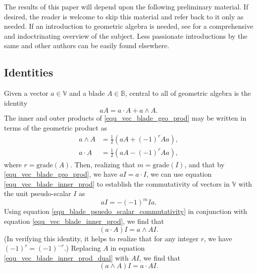 \documentclass{birkjour}
\theoremstyle{definition}
\theoremstyle{remark}
\numberwithin{equation}{section}
\newcommand{\B}{\mathbb{B}}
\newcommand{\V}{\mathbb{V}}
\newcommand{\grade}{\mbox{grade}}
\begin{document}
The results of this paper will depend upon the following preliminary material.
If desired, the reader is welcome to skip this material and refer back to it only as needed.
If an introduction to geometric algebra is needed, see \cite{Hestenes02} for a
comprehensive and indoctrinating overview of the subject.  Less passionate introductions
by the same and other authors can be easily found elsewhere.

\subsection{Identities}

Given a vector $a\in\V$ and a blade $A\in\B$, central to all of geometric algebra is the identity
\begin{equation}\label{equ_vec_blade_geo_prod}
aA = a\cdot A + a\wedge A.
\end{equation}
The inner and outer products of \eqref{equ_vec_blade_geo_prod} may be written in terms
of the geometric product as
\begin{align}
a\wedge A &= \frac{1}{2}\left(aA + (-1)^rAa\right),\label{equ_vec_blade_outer_prod} \\
a\cdot A &= \frac{1}{2}\left(aA - (-1)^rAa\right),\label{equ_vec_blade_inner_prod}
\end{align}
where $r=\grade(A)$.  Then, realizing that $m=\grade(I)$, and that by \eqref{equ_vec_blade_geo_prod},
we have $aI=a\cdot I$, we can use equation \eqref{equ_vec_blade_inner_prod} to establish the
commutativity of vectors in $\V$ with the unit pseudo-scalar $I$ as
\begin{equation}\label{equ_blade_psuedo_scalar_commutativity}
aI = -(-1)^mIa.
\end{equation}
Using equation \eqref{equ_blade_psuedo_scalar_commutativity} in conjunction with equation \eqref{equ_vec_blade_inner_prod},
we find that
\begin{equation}\label{equ_vec_blade_inner_prod_dual}
(a\cdot A)I=a\wedge AI.
\end{equation}
(In verifying this identity, it helps to realize that for any integer $r$, we have $(-1)^r=(-1)^{-r}$.)
Replacing $A$ in equation \eqref{equ_vec_blade_inner_prod_dual} with $AI$, we find that
\begin{equation}\label{equ_vec_blade_outer_prod_dual}
(a\wedge A)I=a\cdot AI.
\end{equation}
\end{document}
